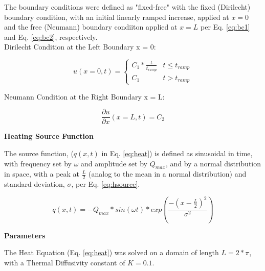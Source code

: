 \documentclass[10pt, letter, showtrims]{extarticle}
\begin{document}
		\noindent
		The boundary conditions were defined as "fixed-free" with the fixed (Dirilecht) boundary condition, with an initial linearly ramped increase, applied at $x = 0$ and the free (Neumann) boundary condiiton applied at $x = L$ per Eq. \ref{eq:bc1} and Eq. \ref{eq:bc2}, respectively. \\
		
		\noindent
		Dirilecht Condition at the Left Boundary x = 0:
	
		\begin{equation}
		\label{eq:bc1}
			u(x=0, t) = \begin{cases} 
          					C_{1} * \frac{t}{t_{ramp}} & t\leq t_{ramp} \\
          					C_{1}                      & t > t_{ramp}
       					\end{cases}
    		\end{equation}
    
    		\noindent
    		Neumann Condition at the Right Boundary x = L:
    
    		\begin{equation}
    		\label{eq:bc2}
			\frac{\partial u}{\partial x}(x=L, t) = C_{2}
    		\end{equation}		

		\noindent
		\textbf{Heating Source Function}
		
		
		\noindent
		The source function, ($q(x, t)$ in Eq. \ref{eq:heat}) is defined as sinusoidal in time, with frequency set by $\omega$ and amplitude set by $Q_{max}$, and by a normal distribution in space, with a peak at $\frac{L}{2}$ (analog to the mean in a normal distribution) and standard deviation, $\sigma$, per Eq. \ref{eq:hsource}.		
		
		\begin{equation}
		\label{eq:hsource}
			q(x, t) = - Q_{max} * sin(\omega t) * exp\left(\frac{-(x - \frac{L}{2})^{2}}{\sigma^{2}}\right)
		\end{equation}	
		
		\pagebreak
		
		\noindent
		\textbf{Parameters}
		
		\noindent
		The Heat Equation (Eq. \ref{eq:heat}) was solved on a domain of length $L = 2*\pi$, with a Thermal Diffusivity constant of $K = 0.1$. \\
		
\end{document}
